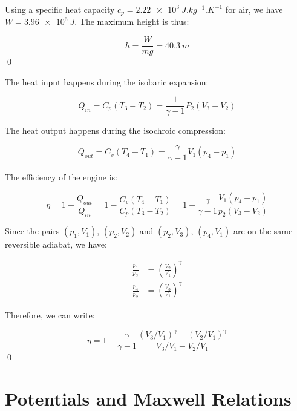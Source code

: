\documentclass[12pt]{article}
\begin{document}
Using a specific heat capacity $c_{p} = \qty{2.22e3}{J.kg^{-1}.K^{-1}}$ for air, we have $W = \qty{3.96e6}{J}$. The maximum height is thus:

\begin{equation}
    h = \frac{W}{m g} = \qty{40.3}{m}
\end{equation}
\qed


The heat input happens during the isobaric expansion:

\begin{equation}
    Q_{in} = C_{p} (T_{3} - T_{2}) = \frac{1}{\gamma - 1} P_{2} (V_{3} - V_{2})
\end{equation}

The heat output happens during the isochroic compression:

\begin{equation}
    Q_{out} = C_{v} (T_{4} - T_{1}) = \frac{\gamma}{\gamma - 1} V_{1} (p_{4} - p_{1})
\end{equation}

The efficiency of the engine is:

\begin{equation}
    \eta = 1 - \frac{Q_{out}}{Q_{in}} = 1 - \frac{C_{v} (T_{4} - T_{1})}{C_{p} (T_{3} - T_{2})} = 1 - \frac{\gamma}{\gamma - 1} \frac{V_{1} (p_{4} - p_{1})}{p_{2} (V_{3} - V_{2})}
\end{equation}

Since the pairs $(p_{1}, V_{1})$, $(p_{2}, V_{2})$ and $(p_{2}, V_{3})$, $(p_{4}, V_{1})$ are on the same reversible adiabat, we have:

\begin{equation}
\begin{split}
    \frac{p_{1}}{p_{2}} &= \left( \frac{V_{2}}{V_{1}} \right)^{\gamma} \\
    \frac{p_{4}}{p_{2}} &= \left( \frac{V_{3}}{V_{1}} \right)^{\gamma}
\end{split}
\end{equation}

Therefore, we can write:

\begin{equation}
    \eta = 1 - \frac{\gamma}{\gamma - 1} \frac{(V_{3}/V_{1})^{\gamma} - (V_{2}/V_{1})^{\gamma}}{V_{3}/V_{1} - V_{2}/V_{1}}
\end{equation}
\qed


\pagebreak
\section*{Potentials and Maxwell Relations}
\end{document}
